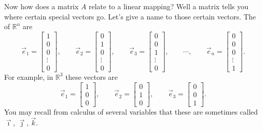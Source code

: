 Now how does a matrix $A$ relate to a linear mapping?
Well a matrix tells you where
certain special vectors go.  Let's give a name to those certain vectors.
The \emph{} of ${\mathbb R}^n$ are
\begin{equation*}
\vec{e}_1 =
\begin{bmatrix}
1 \\ 0 \\ 0 \\ \vdots \\ 0
\end{bmatrix} ,
\qquad
\vec{e}_2 =
\begin{bmatrix}
0 \\ 1 \\ 0 \\ \vdots \\ 0
\end{bmatrix} ,
\qquad
\vec{e}_3 =
\begin{bmatrix}
0 \\ 0 \\ 1 \\ \vdots \\ 0
\end{bmatrix} ,
\qquad
\cdots ,
\qquad
\vec{e}_n =
\begin{bmatrix}
0 \\ 0 \\ 0 \\ \vdots \\ 1
\end{bmatrix} .
\end{equation*}
For example, in ${\mathbb R}^3$ these vectors are
\begin{equation*}
\vec{e}_1 =
\begin{bmatrix}
1 \\ 0 \\ 0
\end{bmatrix} ,
\qquad
\vec{e}_2 =
\begin{bmatrix}
0 \\ 1 \\ 0
\end{bmatrix} ,
\qquad
\vec{e}_3 =
\begin{bmatrix}
0 \\ 0 \\ 1
\end{bmatrix} .
\end{equation*}
You may recall from calculus of several variables that these are
sometimes called $\vec{\imath}$, $\vec{\jmath}$, $\vec{k}$.

